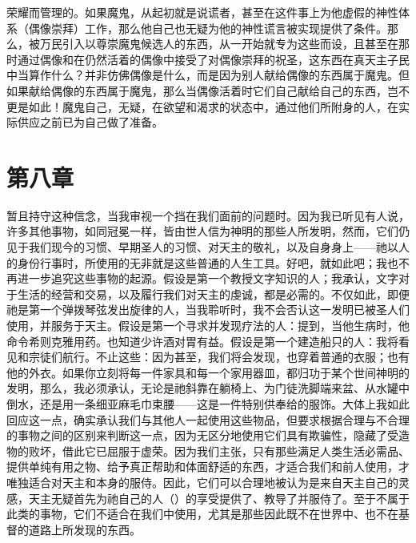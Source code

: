 荣耀而管理的。如果魔鬼，从起初就是说谎者，甚至在这件事上为他虚假的神性体系（偶像崇拜）工作，那么他自己也无疑为他的神性谎言被实现提供了条件。那么，被万民引入以尊崇魔鬼候选人的东西，从一开始就专为这些而设，且甚至在那时通过偶像和在仍然活着的偶像中接受了对偶像崇拜的祝圣，这东西在真天主子民中当算作什么？并非仿佛偶像是什么，而是因为别人献给偶像的东西属于魔鬼。但如果献给偶像的东西属于魔鬼，那么当偶像活着时它们自己献给自己的东西，岂不更是如此！魔鬼自己，无疑，在欲望和渴求的状态中，通过他们所附身的人，在实际供应之前已为自己做了准备。\par


\section{第八章}

暂且持守这种信念，当我审视一个挡在我们面前的问题时。因为我已听见有人说，许多其他事物，如同冠冕一样，皆由世人信为神明的那些人所发明，然而，它们仍见于我们现今的习惯、早期圣人的习惯、对天主的敬礼，以及自身身上——祂以人的身份行事时，所使用的无非就是这些普通的人生工具。好吧，就如此吧；我也不再进一步追究这些事物的起源。假设是第一个教授文字知识的人；我承认，文字对于生活的经营和交易，以及履行我们对天主的虔诚，都是必需的。不仅如此，即便祂是第一个弹拨琴弦发出旋律的人，当我聆听时，我不会否认这一发明已被圣人们使用，并服务于天主。假设是第一个寻求并发现疗法的人：提到，当他生病时，他命令希则克雅用药。也知道少许酒对胃有益。假设是第一个建造船只的人：我将看见和宗徒们航行。不止这些：因为甚至，我们将会发现，也穿着普通的衣服；也有他的外衣。如果你立刻将每一件家具和每一个家用器皿，都归功于某个世间神明的发明，那么，我必须承认，无论是祂斜靠在躺椅上、为门徒洗脚端来盆、从水罐中倒水，还是用一条细亚麻毛巾束腰——这是一件特别供奉给的服饰。大体上我如此回应这一点，确实承认我们与其他人一起使用这些物品，但要求根据合理与不合理的事物之间的区别来判断这一点，因为无区分地使用它们具有欺骗性，隐藏了受造物的败坏，借此它已屈服于虚荣。因为我们主张，只有那些满足人类生活必需品、提供单纯有用之物、给予真正帮助和体面舒适的东西，才适合我们和前人使用，才唯独适合对天主和本身的服侍。因此，它们可以合理地被认为是来自天主自己的灵感，天主无疑首先为祂自己的人（）的享受提供了、教导了并服侍了。至于不属于此类的事物，它们不适合在我们中使用，尤其是那些因此既不在世界中、也不在基督的道路上所发现的东西。\par

